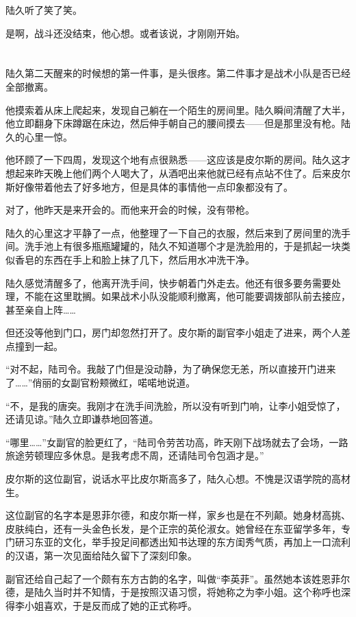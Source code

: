陆久听了笑了笑。

是啊，战斗还没结束，他心想。或者该说，才刚刚开始。
\section*{}

陆久第二天醒来的时候想的第一件事，是头很疼。第二件事才是战术小队是否已经全部撤离。

他摸索着从床上爬起来，发现自己躺在一个陌生的房间里。陆久瞬间清醒了大半，他立即翻身下床蹲踞在床边，然后伸手朝自己的腰间摸去——但是那里没有枪。陆久的心里一惊。

他环顾了一下四周，发现这个地有点很熟悉——这应该是皮尔斯的房间。陆久这才想起来昨天晚上他们两个人喝大了，从酒吧出来他就已经有点站不住了。后来皮尔斯好像带着他去了好多地方，但是具体的事情他一点印象都没有了。

对了，他昨天是来开会的。而他来开会的时候，没有带枪。

陆久的心里这才平静了一点，他整理了一下自己的衣服，然后来到了房间里的洗手间。洗手池上有很多瓶瓶罐罐的，陆久不知道哪个才是洗脸用的，于是抓起一块类似香皂的东西在手上和脸上抹了几下，然后用水冲洗干净。

陆久感觉清醒多了，他离开洗手间，快步朝着门外走去。他还有很多要务需要处理，不能在这里耽搁。如果战术小队没能顺利撤离，他可能要调拨部队前去接应，甚至亲自上阵……

但还没等他到门口，房门却忽然打开了。皮尔斯的副官李小姐走了进来，两个人差点撞到一起。

“对不起，陆司令。我敲了门但是没动静，为了确保您无恙，所以直接开门进来了……”俏丽的女副官粉颊微红，喏喏地说道。

“不，是我的唐突。我刚才在洗手间洗脸，所以没有听到门响，让李小姐受惊了，还请见谅。”陆久立即谦恭地回答道。

“哪里……”女副官的脸更红了，“陆司令劳苦功高，昨天刚下战场就去了会场，一路旅途劳顿理应多休息。是我考虑不周，还请陆司令包涵才是。”

皮尔斯的这位副官，说话水平比皮尔斯高多了，陆久心想。不愧是汉语学院的高材生。

这位副官的名字本是恩菲尔德，和皮尔斯一样，家乡也是在不列颠。她身材高挑、皮肤纯白，还有一头金色长发，是个正宗的英伦淑女。她曾经在东亚留学多年，专门研习东亚的文化，举手投足间都透出知书达理的东方闺秀气质，再加上一口流利的汉语，第一次见面给陆久留下了深刻印象。

副官还给自己起了一个颇有东方古韵的名字，叫做“李英菲”。虽然她本该姓恩菲尔德，是陆久当时并不知情，于是按照汉语习惯，将她称之为李小姐。这个称呼也深得李小姐喜欢，于是反而成了她的正式称呼。

